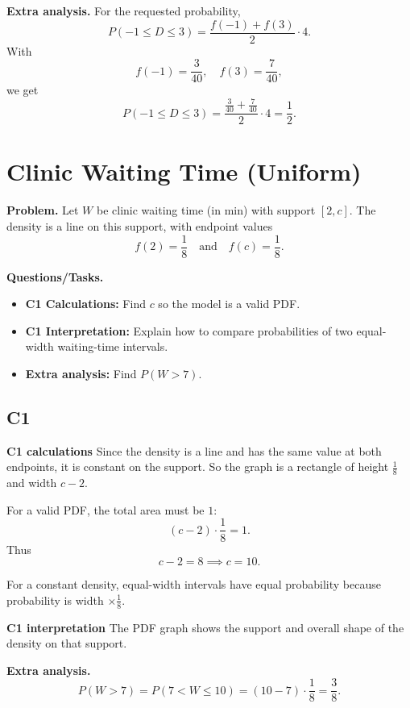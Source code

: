 	\textbf{Extra analysis.}
	For the requested probability,
	\[
	P(-1\le D\le3)=\frac{f(-1)+f(3)}{2}\cdot4.
	\]
	With
	\[
	f(-1)=\frac{3}{40},\quad f(3)=\frac{7}{40},
	\]
	we get
	\[
	P(-1\le D\le3)=\frac{\frac{3}{40}+\frac{7}{40}}{2}\cdot4=\frac12.
	\]

	
	\section{Clinic Waiting Time (Uniform)}
	
	\textbf{Problem.}
	Let $W$ be clinic waiting time (in min) with support $[2,c]$. The density is a line on this support, with endpoint values
	\[
	f(2)=\frac18
	\quad\text{and}\quad
	f(c)=\frac18.
	\]
	
	\textbf{Questions/Tasks.}
	\begin{itemize}
		\item \textbf{C1 Calculations:} Find $c$ so the model is a valid PDF.
		\item \textbf{C1 Interpretation:} Explain how to compare probabilities of two equal-width waiting-time intervals.
		\item \textbf{Extra analysis:} Find $P(W>7)$.
	\end{itemize}
	
	\subsection*{C1}
	
	\textbf{C1 calculations}
	Since the density is a line and has the same value at both endpoints, it is constant on the support. So the graph is a rectangle of height $\frac18$ and width $c-2$.
	
	For a valid PDF, the total area must be $1$:
	\[
	(c-2)\cdot\frac18=1.
	\]
	Thus
	\[
	c-2=8\implies c=10.
	\]
	
	For a constant density, equal-width intervals have equal probability because probability is width $\times \frac18$.
	
	\textbf{C1 interpretation}
	The PDF graph shows the support and overall shape of the density on that support.
	
	\textbf{Extra analysis.}
	\[
	P(W>7)=P(7<W\le10)=(10-7)\cdot\frac18=\frac38.
	\]

	
